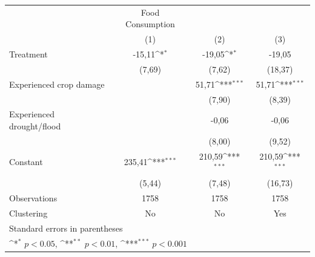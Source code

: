{
\def\sym#1{\ifmmode^{#1}\else\(^{#1}\)\fi}
\begin{tabular}{l*{3}{c}}
\hline\hline
                    &Food Consumption                                                 \\
                    &\multicolumn{1}{c}{(1)}         &\multicolumn{1}{c}{(2)}         &\multicolumn{1}{c}{(3)}         \\
\hline
Treatment           &      -15,11\sym{*}  &      -19,05\sym{*}  &      -19,05         \\
                    &      (7,69)         &      (7,62)         &     (18,37)         \\
[1em]
Experienced crop damage&                     &       51,71\sym{***}&       51,71\sym{***}\\
                    &                     &      (7,90)         &      (8,39)         \\
[1em]
Experienced drought/flood&                     &       -0,06         &       -0,06         \\
                    &                     &      (8,00)         &      (9,52)         \\
[1em]
Constant            &      235,41\sym{***}&      210,59\sym{***}&      210,59\sym{***}\\
                    &      (5,44)         &      (7,48)         &     (16,73)         \\
\hline
Observations        &        1758         &        1758         &        1758         \\
Clustering          &          No         &          No         &         Yes         \\
\hline\hline
\multicolumn{4}{l}{\footnotesize Standard errors in parentheses}\\
\multicolumn{4}{l}{\footnotesize \sym{*} \(p<0.05\), \sym{**} \(p<0.01\), \sym{***} \(p<0.001\)}\\
\end{tabular}
}

